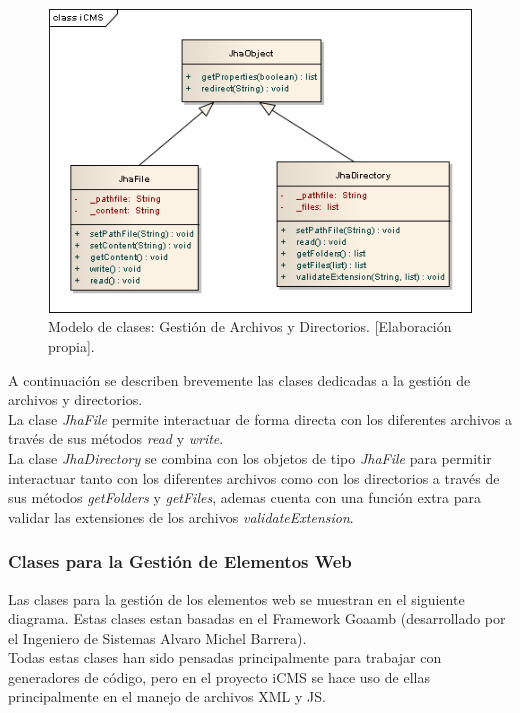 \begin{figure}[h]
\centering
\includegraphics[scale=.5, keepaspectratio=true]{imagenes/07_imagen.png}
\caption{Modelo de clases: Gesti\'on de Archivos y Directorios. [Elaboraci\'on propia].}
\end{figure}

A continuaci\'on se describen brevemente las clases dedicadas a la gesti\'on de archivos y directorios.\\

La clase \emph{JhaFile} permite interactuar de forma directa con los diferentes archivos a trav\'es de sus m\'etodos \emph{read} y \emph{write}.\\



La clase \emph{JhaDirectory} se combina con los objetos de tipo \emph{JhaFile} para permitir interactuar tanto con los diferentes archivos como con los directorios a trav\'es de sus m\'etodos \emph{getFolders} y \emph{getFiles}, ademas cuenta con una funci\'on extra para validar las extensiones de los archivos \emph{validateExtension}.\\



\subsubsection{Clases para la Gesti\'on de Elementos Web}
Las clases para la gesti\'on de los elementos web se muestran en el siguiente diagrama. Estas clases estan basadas en el Framework Goaamb (desarrollado por el Ingeniero de Sistemas Alvaro Michel Barrera).\\
Todas estas clases han sido pensadas principalmente para trabajar con generadores de c\'odigo, pero en el proyecto iCMS se hace uso de ellas principalmente en el manejo de archivos XML y JS.\\

